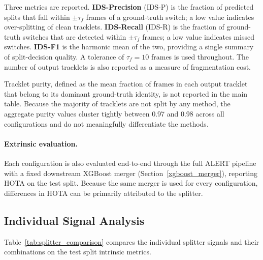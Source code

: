 Three metrics are reported. \textbf{IDS-Precision} (IDS-P) is the fraction
of predicted splits that fall within $\pm\tau_f$ frames of a ground-truth
switch; a low value indicates over-splitting of clean tracklets.
\textbf{IDS-Recall} (IDS-R) is the fraction of ground-truth switches that
are detected within $\pm\tau_f$ frames; a low value indicates missed
switches. \textbf{IDS-F1} is the harmonic mean of the two, providing a
single summary of split-decision quality. A tolerance of $\tau_f = 10$
frames is used throughout. The number of output tracklets is also reported
as a measure of fragmentation cost.

Tracklet purity, defined as the mean fraction of frames in each output
tracklet that belong to its dominant ground-truth identity, is not reported
in the main table. Because the majority of tracklets are not split by any
method, the aggregate purity values cluster tightly between 0.97 and 0.98
across all configurations and do not meaningfully differentiate the methods.

\paragraph{Extrinsic evaluation.}
Each configuration is also evaluated end-to-end through the full ALERT
pipeline with a fixed downstream XGBoost merger (Section~\ref{xgboost_merger}),
reporting HOTA on the test split. Because the same merger is used for every
configuration, differences in HOTA can be primarily attributed to the splitter.

\subsection{Individual Signal Analysis}\label{subsec:individual_signals}

Table~\ref{tab:splitter_comparison} compares the individual splitter signals
and their combinations on the test split intrinsic metrics.

